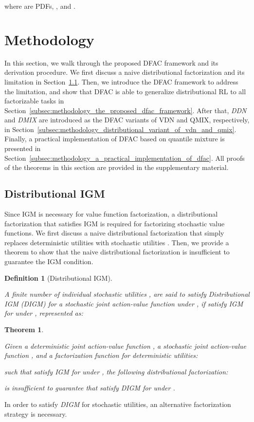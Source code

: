 \documentclass{article}
\newcommand{\ddn}{\textit{DDN}}
\newcommand{\dmix}{\textit{DMIX}}
\newcommand{\digm}{\textit{DIGM}}
\newcounter{definition}
\newtheorem{theorem}{Theorem}[section]
\newtheorem{definition}[definition]{Definition}
\begin{document}
where  are PDFs, , and .
 \section{Methodology}
\label{sec:methodology}

In this section, we walk through the proposed DFAC framework and its derivation procedure. We first discuss a naive distributional factorization and its limitation in Section~\ref{subsec:methodology_distributional_igm_condition}. Then, we introduce the DFAC framework to address the limitation, and show that DFAC is able to generalize distributional RL to all factorizable tasks in Section~\ref{subsec:methodology_the_proposed_dfac_framework}. After that, \ddn{} and \dmix{} are introduced as the DFAC variants of VDN and QMIX, respectively, in Section~\ref{subsec:methodology_distributional_variant_of_vdn_and_qmix}. Finally, a practical implementation of DFAC based on quantile mixture is presented in Section~\ref{subsec:methodology_a_practical_implementation_of_dfac}. All proofs of the theorems in this section are provided in the supplementary material.



\subsection{Distributional IGM}
\label{subsec:methodology_distributional_igm_condition}

Since IGM is necessary for value function factorization, a distributional factorization that satisfies IGM is required for factorizing stochastic value functions. We first discuss a naive distributional factorization that simply replaces deterministic utilities  with stochastic utilities . Then, we provide a theorem to show that the naive distributional factorization is insufficient to guarantee the IGM condition.

\begin{definition}[Distributional IGM]
\label{def:distributional_igm}

A finite number of individual stochastic utilities , are said to satisfy Distributional IGM (\digm{}) for a stochastic joint action-value function  under , if  satisfy IGM for  under , represented as:

\end{definition} 
\begin{theorem}
\label{thm:distributional_igm}

Given a deterministic joint action-value function , a stochastic joint action-value function , and a factorization function  for deterministic utilities:

such that  satisfy IGM for  under , the following distributional factorization:


is insufficient to guarantee that  satisfy \digm{} for  under .

\end{theorem} 
In order to satisfy \digm{} for stochastic utilities, an alternative factorization strategy is necessary.
\end{document}
